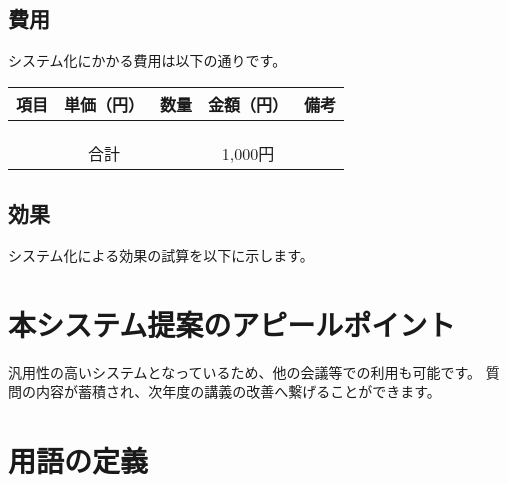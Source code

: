 \documentclass[a4j,titlepage]{ujarticle}
\begin{document}
\subsection{費用}
システム化にかかる費用は以下の通りです。

\begin{table}[htb]
  \begin{tabular}{|c|c|c|c|c|} \hline
    項目 & 単価（円） & 数量 & 金額（円） & 備考 \\ \hline
     &  &  &  &  \\ \hline
     &  &  &  &  \\ \hline
     &  &  &  &  \\ \hline
    \multicolumn{3}{c||}{合計}& 1,000円 &  \\ \hline
  \end{tabular}
\end{table}


\subsection{効果}
システム化による効果の試算を以下に示します。

\section{本システム提案のアピールポイント}
汎用性の高いシステムとなっているため、他の会議等での利用も可能です。
質問の内容が蓄積され、次年度の講義の改善へ繋げることができます。

\section{用語の定義}
\newpage
\end{document}
